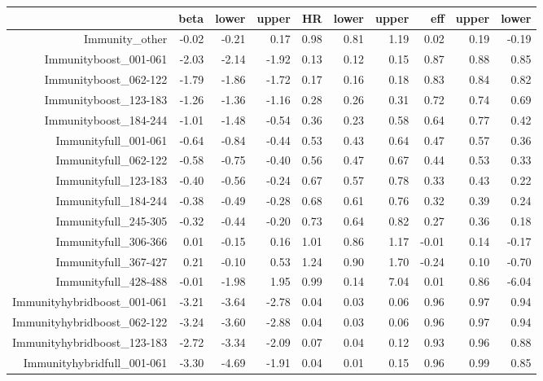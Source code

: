\begin{table}[ht]
\centering
\begin{tabular}{rrrrrrrrrr}
  \hline
 & beta & lower & upper & HR & lower & upper & eff & upper & lower \\ 
  \hline
Immunity\_other & -0.02 & -0.21 & 0.17 & 0.98 & 0.81 & 1.19 & 0.02 & 0.19 & -0.19 \\ 
  Immunityboost\_001-061 & -2.03 & -2.14 & -1.92 & 0.13 & 0.12 & 0.15 & 0.87 & 0.88 & 0.85 \\ 
  Immunityboost\_062-122 & -1.79 & -1.86 & -1.72 & 0.17 & 0.16 & 0.18 & 0.83 & 0.84 & 0.82 \\ 
  Immunityboost\_123-183 & -1.26 & -1.36 & -1.16 & 0.28 & 0.26 & 0.31 & 0.72 & 0.74 & 0.69 \\ 
  Immunityboost\_184-244 & -1.01 & -1.48 & -0.54 & 0.36 & 0.23 & 0.58 & 0.64 & 0.77 & 0.42 \\ 
  Immunityfull\_001-061 & -0.64 & -0.84 & -0.44 & 0.53 & 0.43 & 0.64 & 0.47 & 0.57 & 0.36 \\ 
  Immunityfull\_062-122 & -0.58 & -0.75 & -0.40 & 0.56 & 0.47 & 0.67 & 0.44 & 0.53 & 0.33 \\ 
  Immunityfull\_123-183 & -0.40 & -0.56 & -0.24 & 0.67 & 0.57 & 0.78 & 0.33 & 0.43 & 0.22 \\ 
  Immunityfull\_184-244 & -0.38 & -0.49 & -0.28 & 0.68 & 0.61 & 0.76 & 0.32 & 0.39 & 0.24 \\ 
  Immunityfull\_245-305 & -0.32 & -0.44 & -0.20 & 0.73 & 0.64 & 0.82 & 0.27 & 0.36 & 0.18 \\ 
  Immunityfull\_306-366 & 0.01 & -0.15 & 0.16 & 1.01 & 0.86 & 1.17 & -0.01 & 0.14 & -0.17 \\ 
  Immunityfull\_367-427 & 0.21 & -0.10 & 0.53 & 1.24 & 0.90 & 1.70 & -0.24 & 0.10 & -0.70 \\ 
  Immunityfull\_428-488 & -0.01 & -1.98 & 1.95 & 0.99 & 0.14 & 7.04 & 0.01 & 0.86 & -6.04 \\ 
  Immunityhybridboost\_001-061 & -3.21 & -3.64 & -2.78 & 0.04 & 0.03 & 0.06 & 0.96 & 0.97 & 0.94 \\ 
  Immunityhybridboost\_062-122 & -3.24 & -3.60 & -2.88 & 0.04 & 0.03 & 0.06 & 0.96 & 0.97 & 0.94 \\ 
  Immunityhybridboost\_123-183 & -2.72 & -3.34 & -2.09 & 0.07 & 0.04 & 0.12 & 0.93 & 0.96 & 0.88 \\ 
  Immunityhybridfull\_001-061 & -3.30 & -4.69 & -1.91 & 0.04 & 0.01 & 0.15 & 0.96 & 0.99 & 0.85 \\ 

\end{tabular}
\end{table}
